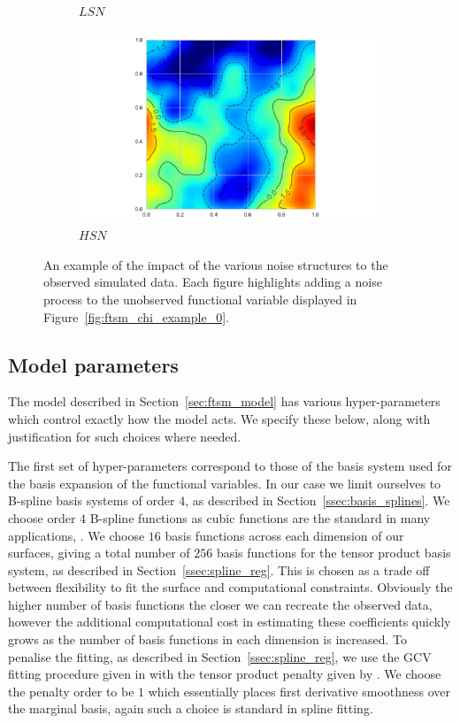 \begin{figure}
\begin{subfigure}[b]{0.45\textwidth}
		\caption{$LSN$}
	\end{subfigure}
	\begin{subfigure}[b]{0.45\textwidth}
		\includegraphics[width=\textwidth]{sim_noise_example_hsn}
		\caption{$HSN$}
	\end{subfigure}  
	\caption[An example of the impact of noise to observed simulated data.]{An example of the impact of the various noise structures to the observed simulated data. Each figure highlights adding a noise process to the unobserved functional variable displayed in Figure~\ref{fig:ftsm_chi_example_0}.}
	\label{fig:ftsm_noise_example}
\end{figure}

\subsection{Model parameters \label{ssec:sim_params}}
The model described in Section~\ref{sec:ftsm_model} has various hyper-parameters which control exactly how the model acts.
We specify these  below, along with justification for such choices where needed.

The first set of hyper-parameters correspond to those of the basis system used for the basis expansion of the functional variables.
In our case we limit ourselves to B-spline basis systems of order $4$, as described in Section~\ref{ssec:basis_splines}.
We choose order $4$ B-spline functions as cubic functions are the standard in many applications, \citep{de_boor_practical_2001}. 
We choose $16$ basis functions across each dimension of our surfaces, giving a total number of $256$ basis functions for the tensor product basis system, as described in Section~\ref{ssec:spline_reg}. 
This is chosen as a trade off between flexibility to fit the surface and computational constraints. 
Obviously the higher number of basis functions the closer we can recreate the observed data, however the additional computational cost in estimating these coefficients quickly grows as the number of basis functions in each dimension is increased.
To penalise the fitting, as described in Section~\ref{ssec:spline_reg}, we use the GCV fitting procedure given in \citep{wahba_spline_1990} with the tensor product penalty given by \citep{wood_p-splines_2017}.
We choose the penalty order to be $1$ which essentially places first derivative smoothness over the marginal basis, again such a choice is standard in spline fitting. 

